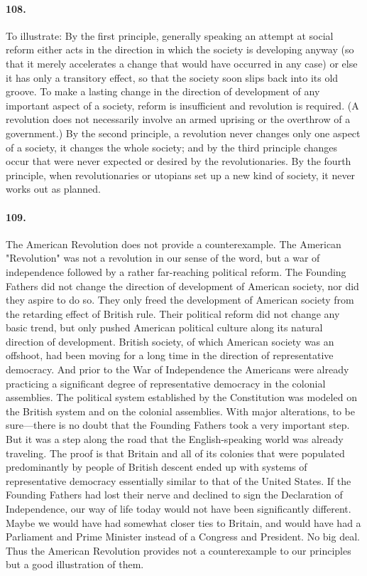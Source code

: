 \documentclass[12pt]{book}
\begin{document}
\paragraph{108.}  To illustrate: By the first principle, generally speaking an attempt at social reform either acts in the direction in which the society is developing anyway (so that it merely accelerates a change that would have occurred in any case) or else it has only a transitory effect, so that the society soon slips back into its old groove. To make a lasting change in the direction of development of any important aspect of a society, reform is insufficient and revolution is required. (A revolution does not necessarily involve an armed uprising or the overthrow of a government.) By the second principle, a revolution never changes only one aspect of a society, it changes the whole society; and by the third principle changes occur that were never expected or desired by the revolutionaries. By the fourth principle, when revolutionaries or utopians set up a new kind of society, it never works out as planned.


\paragraph{109.} The American Revolution does not provide a counterexample. The American "Revolution" was not a revolution in our sense of the word, but a war of independence followed by a rather far-reaching political reform. The Founding Fathers did not change the direction of development of American society, nor did they aspire to do so. They only freed the development of American society from the retarding effect of British rule. Their political reform did not change any basic trend, but only pushed American political culture along its natural direction of development. British society, of which American society was an offshoot, had been moving for a long time in the direction of representative democracy. And prior to the War of Independence the Americans were already practicing a significant degree of representative democracy in the colonial assemblies. The political system established by the Constitution was modeled on the British system and on the colonial assemblies. With major alterations, to be sure---there is no doubt that the Founding Fathers took a very important step. But it was a step along the road that the English-speaking world was already traveling. The proof is that Britain and all of its colonies that were populated predominantly by people of British descent ended up with systems of representative democracy essentially similar to that of the United States. If the Founding Fathers had lost their nerve and declined to sign the Declaration of Independence, our way of life today would not have been significantly different. Maybe we would have had somewhat closer ties to Britain, and would have had a Parliament and Prime Minister instead of a Congress and President. No big deal. Thus the American Revolution provides not a counterexample to our principles but a good illustration of them.
\end{document}
